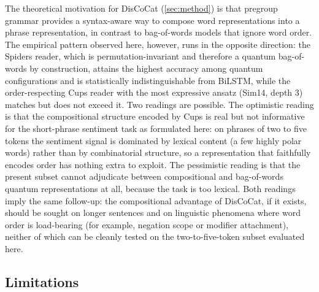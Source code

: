 \documentclass[runningheads]{llncs}
\begin{document}
The theoretical motivation for DisCoCat (\cref{sec:method}) is that
pregroup grammar provides a syntax-aware way to compose word
representations into a phrase representation, in contrast to
bag-of-words models that ignore word order. The empirical pattern
observed here, however, runs in the opposite direction: the Spiders
reader, which is permutation-invariant and therefore a quantum
bag-of-words by construction, attains the highest accuracy among
quantum configurations and is statistically indistinguishable from
BiLSTM, while the order-respecting Cups reader with the most
expressive ansatz (Sim14, depth 3) matches but does not exceed it.
Two readings are possible. The optimistic reading is that the
compositional structure encoded by Cups is real but not informative
for the short-phrase sentiment task as formulated here: on phrases
of two to five tokens the sentiment signal is dominated by lexical
content (a few highly polar words) rather than by combinatorial
structure, so a representation that faithfully encodes order has
nothing extra to exploit. The pessimistic reading is that the
present subset cannot adjudicate between compositional and
bag-of-words quantum representations at all, because the task is too
lexical. Both readings imply the same follow-up: the compositional
advantage of DisCoCat, if it exists, should be sought on longer
sentences and on linguistic phenomena where word order is
load-bearing (for example, negation scope or modifier attachment),
neither of which can be cleanly tested on the two-to-five-token
subset evaluated here.

\subsection{Limitations}
\end{document}

